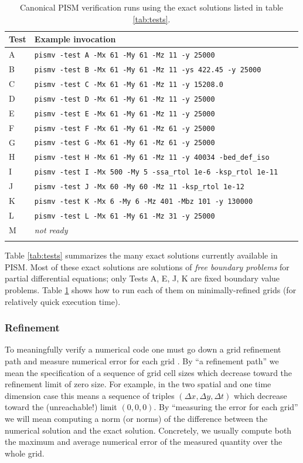 \documentclass[11pt,final]{amsart}
\begin{document}
\begin{table}[ht]
\caption{Canonical PISM verification runs using the exact solutions listed in table \ref{tab:tests}.}\label{tab:tests_exec}
\small
\begin{tabular}{@{}llll}\hline
\textbf{Test} & \textbf{Example invocation}  \\ \hline
A & \verb|pismv -test A -Mx 61 -My 61 -Mz 11 -y 25000| \\
B & \verb|pismv -test B -Mx 61 -My 61 -Mz 11 -ys 422.45 -y 25000|  \\
C & \verb|pismv -test C -Mx 61 -My 61 -Mz 11 -y 15208.0|  \\
D & \verb|pismv -test D -Mx 61 -My 61 -Mz 11 -y 25000|  \\
E & \verb|pismv -test E -Mx 61 -My 61 -Mz 11 -y 25000|  \\
F & \verb|pismv -test F -Mx 61 -My 61 -Mz 61 -y 25000|  \\
G & \verb|pismv -test G -Mx 61 -My 61 -Mz 61 -y 25000|  \\
H & \verb|pismv -test H -Mx 61 -My 61 -Mz 11 -y 40034 -bed_def_iso| \\
I & \verb|pismv -test I -Mx 500 -My 5 -ssa_rtol 1e-6 -ksp_rtol 1e-11| \\
J & \verb|pismv -test J -Mx 60 -My 60 -Mz 11 -ksp_rtol 1e-12| \\
K & \verb|pismv -test K -Mx 6 -My 6 -Mz 401 -Mbz 101 -y 130000| \\
L & \verb|pismv -test L -Mx 61 -My 61 -Mz 31 -y 25000| \\
M & \emph{not ready} \\
\hline
\normalsize
\end{tabular}
\end{table}

Table \ref{tab:tests} summarizes the many exact solutions currently available in PISM.  Most of these exact solutions are solutions of \emph{free boundary problems} for partial differential equations; only Tests A, E, J, K are fixed boundary value problems.  Table \ref{tab:tests_exec} shows how to run each of them on minimally-refined grids (for relatively quick execution time).


\subsubsection*{Refinement}  To meaningfully verify a numerical code one must go down a grid refinement path and measure numerical error for each grid \cite{Roache}.  By ``a refinement path'' we mean the specification of a sequence of grid cell sizes which decrease toward the refinement limit of zero size.  For example, in the two spatial and one time dimension case this means a sequence of triples $(\Delta x,\Delta y,\Delta t)$ which decrease toward the (unreachable!) limit $(0,0,0)$.  By ``measuring the error for each grid'' we will mean computing a norm (or norms) of the difference between the numerical solution and the exact solution.   Concretely, we usually compute both the maximum and average numerical error of the measured quantity over the whole grid.
\end{document}
